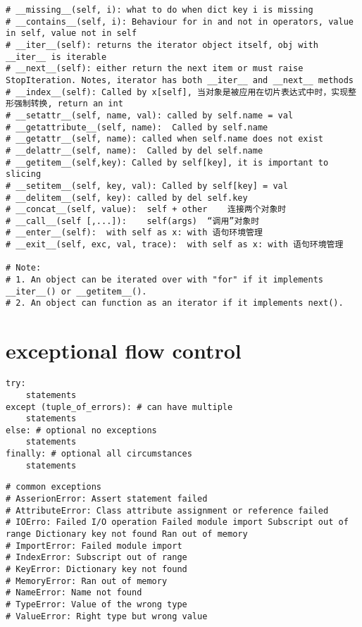\documentclass[11pt]{article}
\begin{document}
\begin{verbatim}
# __missing__(self, i): what to do when dict key i is missing
# __contains__(self, i): Behaviour for in and not in operators, value in self, value not in self
# __iter__(self): returns the iterator object itself, obj with __iter__ is iterable
# __next__(self): either return the next item or must raise StopIteration. Notes, iterator has both __iter__ and __next__ methods
# __index__(self): Called by x[self], 当对象是被应用在切片表达式中时，实现整形强制转换, return an int
# __setattr__(self, name, val): called by self.name = val
# __getattribute__(self, name):  Called by self.name
# __getattr__(self, name): called when self.name does not exist
# __delattr__(self, name):  Called by del self.name
# __getitem__(self,key): Called by self[key], it is important to slicing
# __setitem__(self, key, val): Called by self[key] = val
# __delitem__(self, key): called by del self.key
# __concat__(self, value):	self + other	连接两个对象时
# __call__(self [,...]):	self(args)	“调用”对象时
# __enter__(self):	with self as x:	with 语句环境管理
# __exit__(self, exc, val, trace):	with self as x:	with 语句环境管理

# Note:
# 1. An object can be iterated over with "for" if it implements __iter__() or __getitem__().
# 2. An object can function as an iterator if it implements next().
\end{verbatim}

\section{exceptional flow control}
\label{sec:org1ed4688}
\begin{verbatim}
try:
    statements
except (tuple_of_errors): # can have multiple
    statements
else: # optional no exceptions
    statements
finally: # optional all circumstances
    statements
\end{verbatim}

\begin{verbatim}
# common exceptions
# AsserionError: Assert statement failed
# AttributeError: Class attribute assignment or reference failed
# IOErro: Failed I/O operation Failed module import Subscript out of range Dictionary key not found Ran out of memory
# ImportError: Failed module import
# IndexError: Subscript out of range
# KeyError: Dictionary key not found
# MemoryError: Ran out of memory
# NameError: Name not found
# TypeError: Value of the wrong type
# ValueError: Right type but wrong value
\end{verbatim}
\end{document}
